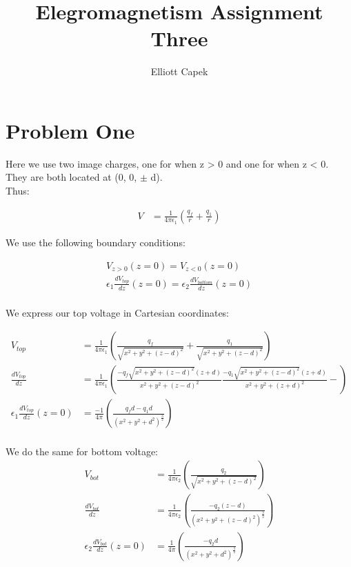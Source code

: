 \documentclass[10pt]{article} %
\title{Elegromagnetism Assignment Three}
\author{Elliott Capek}
\begin{document}
\maketitle{}

\section{Problem One}
Here we use two image charges, one for when z > 0 and one for when z < 0. They are both located at (0, 0, $\pm$ d).\\

Thus:

\begin{align*}
	V &= \frac{1}{4\pi\epsilon_1}\left(\frac{q_f}{r} + \frac{q_1}{r}\right)
\end{align*}

We use the following boundary conditions:

\begin{align*}
	V_{z>0}(z=0) = V_{z<0}(z=0)\\
	\epsilon_1\frac{dV_{top}}{dz}(z=0) = \epsilon_2\frac{dV_{bottom}}{dz}(z=0)\\
\end{align*}

We express our top voltage in Cartesian coordinates:

\begin{align*}
  V_{top} &= \frac{1}{4\pi\epsilon_1} \left(\frac{q_f}{\sqrt{x^2+y^2+(z-d)^2}} + \frac{q_1}{\sqrt{x^2+y^2+(z-d)^2}}\right)\\
  \frac{dV_{top}}{dz} &= \frac{1}{4\pi\epsilon_1}\left(\frac{-q_f\sqrt{x^2+y^2+(z-d)^2}(z+d)}{x^2+y^2+(z-d)^2}
  \frac{-q_1\sqrt{x^2+y^2+(z-d)^2}(z+d)}{x^2+y^2+(z+d)^2} - \right)\\
  \epsilon_1 \frac{dV_{top}}{dz}(z=0) &= \frac{-1}{4\pi}\left(\frac{q_fd-q_1d}{\left(x^2+y^2+d^2\right)^{\frac32}}\right)\\
\end{align*}

We do the same for bottom voltage:
\begin{align*}
  V_{bot} &= \frac{1}{4\pi\epsilon_2} \left(\frac{q_2}{\sqrt{x^2+y^2+(z-d)^2}}\right)\\
  \frac{dV_{bot}}{dz} &= \frac{1}{4\pi\epsilon_2}\left(\frac{-q_2\left(z-d\right)}{\left(x^2+y^2+(z-d)^2\right)^{\frac32}}\right)\\
  \epsilon_2 \frac{dV_{bot}}{dz}(z=0) &= \frac{1}{4\pi}\left(\frac{-q_2d}{\left(x^2+y^2+d^2\right)^{\frac32}}\right)\\
\end{align*}
\end{document}
